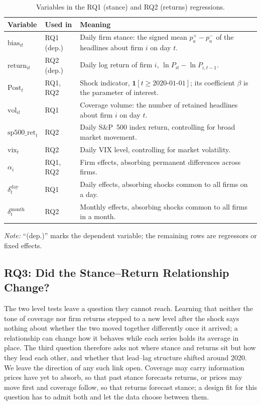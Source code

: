 \documentclass[conference]{IEEEtran}
\begin{document}
\begin{table}[!t]
\centering
\small
\caption{Variables in the RQ1 (stance) and RQ2 (returns) regressions.}
\label{tab:variables}
\begin{tabular}{p{2.6cm}p{1.4cm}p{8.4cm}}
\toprule
\textbf{Variable} & \textbf{Used in} & \textbf{Meaning} \\
\midrule
$\text{bias}_{it}$ & RQ1 (dep.) & Daily firm stance: the signed mean $p^{+}_a-p^{-}_a$ of the headlines about firm $i$ on day $t$. \\
$\text{return}_{it}$ & RQ2 (dep.) & Daily log return of firm $i$, $\ln P_{it}-\ln P_{i,t-1}$. \\
$\text{Post}_t$ & RQ1, RQ2 & Shock indicator, $\mathbf{1}[t\ge\text{2020-01-01}]$; its coefficient $\beta$ is the parameter of interest. \\
$\text{vol}_{it}$ & RQ1 & Coverage volume: the number of retained headlines about firm $i$ on day $t$. \\
$\text{sp500\_ret}_t$ & RQ2 & Daily S\&P~500 index return, controlling for broad market movement. \\
$\text{vix}_t$ & RQ2 & Daily VIX level, controlling for market volatility. \\
$\alpha_i$ & RQ1, RQ2 & Firm effects, absorbing permanent differences across firms. \\
$\delta_t^{\text{day}}$ & RQ1 & Daily effects, absorbing shocks common to all firms on a day. \\
$\delta_t^{\text{month}}$ & RQ2 & Monthly effects, absorbing shocks common to all firms in a month. \\
\bottomrule
\end{tabular}

\vspace{2pt}
{\footnotesize \textit{Note:} ``(dep.)'' marks the dependent variable; the remaining rows are regressors or fixed effects.}
\end{table}

\subsection{RQ3: Did the Stance--Return Relationship Change?}
\label{sec:var}
The two level tests leave a question they cannot reach. Learning that neither the
tone of coverage nor firm returns stepped to a new level after the shock says
nothing about whether the two moved together differently once it arrived; a
relationship can change how it behaves while each series holds its average in
place. The third question therefore asks not where stance and returns sit but how
they lead each other, and whether that lead--lag structure shifted around 2020. We
leave the direction of any such link open. Coverage may carry information prices
have yet to absorb, so that past stance forecasts returns, or prices may move first
and coverage follow, so that returns forecast stance; a design fit for this question
has to admit both and let the data choose between them.
\end{document}
